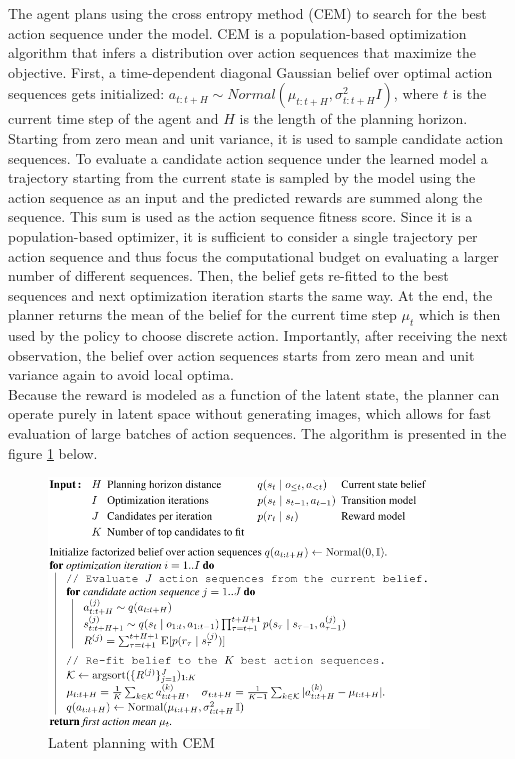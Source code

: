 The agent plans using the cross entropy method (CEM) \cite{Algo.CEM} to search for the best action sequence under the model. CEM is a population-based optimization algorithm that infers a distribution over action sequences that maximize the objective.
First, a time-dependent diagonal Gaussian belief over optimal action sequences gets initialized: $a_{t:t+H} \sim Normal(\mu_{t:t+H}, \sigma^2_{t:t+H}I)$, where $t$ is the current time step of the agent and $H$ is the length of the planning horizon. Starting from zero mean and unit variance, it is used to sample candidate action sequences. To evaluate a candidate action sequence under the learned model a trajectory starting from the current state is sampled by the model using the action sequence as an input and the predicted rewards are summed along the sequence. This sum is used as the action sequence fitness score. Since it is a population-based optimizer, it is sufficient to consider a single trajectory per action sequence and thus focus the computational budget on evaluating a larger number of different sequences. Then, the belief gets re-fitted to the best sequences and next optimization iteration starts the same way. At the end, the planner returns the mean of the belief for the current time step $\mu_t$ which is then used by the policy to choose discrete action. Importantly, after receiving the next observation, the belief over action sequences starts from zero mean and unit variance again to avoid local optima. \\
Because the reward is modeled as a function of the latent state, the planner can operate purely in latent space without generating images, which allows for fast evaluation of large batches of action sequences. The algorithm is presented in the figure \ref{Fig.CEMinPlaNet} below.

\begin{figure}[H]
\includegraphics[width=0.9\textwidth,keepaspectratio]{figures/PlaNet/CEM.png}
\caption{Latent planning with CEM \cite{Algo.PlaNet}}
\label{Fig.CEMinPlaNet}
\end{figure}

